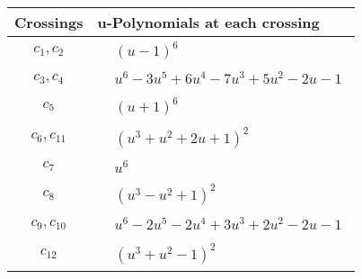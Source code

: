 \documentclass[1p]{elsarticle_modified}
\theoremstyle{definition}
\begin{document}
\begin{tabular}{m{50pt}|m{274pt}}
Crossings & \hspace{64pt}u-Polynomials at each crossing \\
\hline $$\begin{aligned}c_{1},c_{2}\end{aligned}$$&$\begin{aligned}
&(u-1)^6
\end{aligned}$\\
\hline $$\begin{aligned}c_{3},c_{4}\end{aligned}$$&$\begin{aligned}
&u^6-3 u^5+6 u^4-7 u^3+5 u^2-2 u-1
\end{aligned}$\\
\hline $$\begin{aligned}c_{5}\end{aligned}$$&$\begin{aligned}
&(u+1)^6
\end{aligned}$\\
\hline $$\begin{aligned}c_{6},c_{11}\end{aligned}$$&$\begin{aligned}
&(u^3+u^2+2 u+1)^2
\end{aligned}$\\
\hline $$\begin{aligned}c_{7}\end{aligned}$$&$\begin{aligned}
&u^6
\end{aligned}$\\
\hline $$\begin{aligned}c_{8}\end{aligned}$$&$\begin{aligned}
&(u^3- u^2+1)^2
\end{aligned}$\\
\hline $$\begin{aligned}c_{9},c_{10}\end{aligned}$$&$\begin{aligned}
&u^6-2 u^5-2 u^4+3 u^3+2 u^2-2 u-1
\end{aligned}$\\
\hline $$\begin{aligned}c_{12}\end{aligned}$$&$\begin{aligned}
&(u^3+u^2-1)^2
\end{aligned}$\\
\hline
\end{tabular}\\~\\
\end{document}
